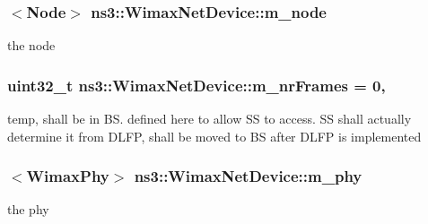 \subsubsection[{\texorpdfstring{m\+\_\+node}{m_node}}]{$<${\bf Node}$>$ ns3\+::\+Wimax\+Net\+Device\+::m\+\_\+node\hspace{0.3cm}{\ttfamily [private]}}\hypertarget{classns3_1_1WimaxNetDevice_ae164e0049ff0faa009a967b9e4757d92}{}\label{classns3_1_1WimaxNetDevice_ae164e0049ff0faa009a967b9e4757d92}


the node 

\subsubsection[{\texorpdfstring{m\+\_\+nr\+Frames}{m_nrFrames}}]{\setlength{\rightskip}{0pt plus 5cm}uint32\+\_\+t ns3\+::\+Wimax\+Net\+Device\+::m\+\_\+nr\+Frames = 0\hspace{0.3cm}{\ttfamily [static]}, {\ttfamily [private]}}\hypertarget{classns3_1_1WimaxNetDevice_aa0ebae2f077c1c1a422a4dc97cc83be4}{}\label{classns3_1_1WimaxNetDevice_aa0ebae2f077c1c1a422a4dc97cc83be4}


temp, shall be in BS. defined here to allow SS to access. SS shall actually determine it from D\+L\+FP, shall be moved to BS after D\+L\+FP is implemented 

\subsubsection[{\texorpdfstring{m\+\_\+phy}{m_phy}}]{$<${\bf Wimax\+Phy}$>$ ns3\+::\+Wimax\+Net\+Device\+::m\+\_\+phy\hspace{0.3cm}{\ttfamily [private]}}\hypertarget{classns3_1_1WimaxNetDevice_a729df9652f39cacba57b0f527bc43f10}{}\label{classns3_1_1WimaxNetDevice_a729df9652f39cacba57b0f527bc43f10}


the phy 

